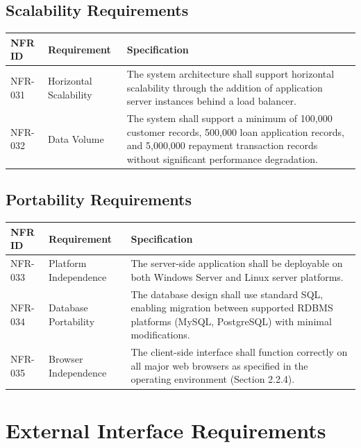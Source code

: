 \documentclass[12pt,a4paper,oneside]{report}
\begin{document}
\subsection{Scalability Requirements}

\begin{table}[htbp]
\centering
\small
\begin{tabularx}{\textwidth}{l l X}
\toprule
\textbf{NFR ID} & \textbf{Requirement} & \textbf{Specification} \\
\midrule
NFR-031 & Horizontal Scalability & The system architecture shall support horizontal scalability through the addition of application server instances behind a load balancer. \\
NFR-032 & Data Volume & The system shall support a minimum of 100,000 customer records, 500,000 loan application records, and 5,000,000 repayment transaction records without significant performance degradation. \\
\bottomrule
\end{tabularx}
\end{table}

\subsection{Portability Requirements}

\begin{table}[htbp]
\centering
\small
\begin{tabularx}{\textwidth}{l l X}
\toprule
\textbf{NFR ID} & \textbf{Requirement} & \textbf{Specification} \\
\midrule
NFR-033 & Platform Independence & The server-side application shall be deployable on both Windows Server and Linux server platforms. \\
NFR-034 & Database Portability & The database design shall use standard SQL, enabling migration between supported RDBMS platforms (MySQL, PostgreSQL) with minimal modifications. \\
NFR-035 & Browser Independence & The client-side interface shall function correctly on all major web browsers as specified in the operating environment (Section 2.2.4). \\
\bottomrule
\end{tabularx}
\end{table}

\section{External Interface Requirements}
\end{document}
